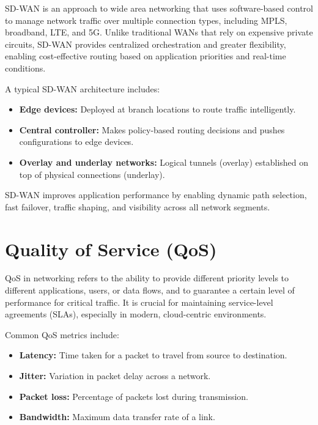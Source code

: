 \documentclass[a4paper,12pt]{Classes/RoboticsLaTeX}
\begin{document}
    SD-WAN is an approach to wide area networking that uses software-based control to manage network traffic over multiple connection types, including MPLS, broadband, LTE, and 5G. Unlike traditional WANs that rely on expensive private circuits, SD-WAN provides centralized orchestration and greater flexibility, enabling cost-effective routing based on application priorities and real-time conditions.
    
    A typical SD-WAN architecture includes:
    \begin{itemize}
        \item \textbf{Edge devices:} Deployed at branch locations to route traffic intelligently.
        \item \textbf{Central controller:} Makes policy-based routing decisions and pushes configurations to edge devices.
        \item \textbf{Overlay and underlay networks:} Logical tunnels (overlay) established on top of physical connections (underlay).
    \end{itemize}
    
    SD-WAN improves application performance by enabling dynamic path selection, fast failover, traffic shaping, and visibility across all network segments.
    
    \section{Quality of Service (QoS)}
    
    QoS in networking refers to the ability to provide different priority levels to different applications, users, or data flows, and to guarantee a certain level of performance for critical traffic. It is crucial for maintaining service-level agreements (SLAs), especially in modern, cloud-centric environments.
    
    Common QoS metrics include:
    \begin{itemize}
        \item \textbf{Latency:} Time taken for a packet to travel from source to destination.
        \item \textbf{Jitter:} Variation in packet delay across a network.
        \item \textbf{Packet loss:} Percentage of packets lost during transmission.
        \item \textbf{Bandwidth:} Maximum data transfer rate of a link.
    \end{itemize}
    
\end{document}
